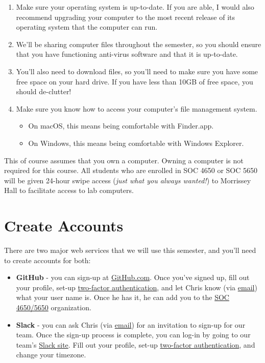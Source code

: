 \documentclass[]{book}
\providecommand{\tightlist}{%
  \setlength{\itemsep}{0pt}\setlength{\parskip}{0pt}}
\begin{document}
\begin{enumerate}
\def\labelenumi{\arabic{enumi}.}
\tightlist
\item
  Make sure your operating system is up-to-date. If you are able, I
  would also recommend upgrading your computer to the most recent
  release of its operating system that the computer can run.
\item
  We'll be sharing computer files throughout the semester, so you should
  ensure that you have functioning anti-virus software and that it is
  up-to-date.
\item
  You'll also need to download files, so you'll need to make sure you
  have some free space on your hard drive. If you have less than 10GB of
  free space, you should de-clutter!
\item
  Make sure you know how to access your computer's file management
  system.

  \begin{itemize}
  \tightlist
  \item
    On macOS, this means being comfortable with Finder.app.
  \item
    On Windows, this means being comfortable with Windows Explorer.
  \end{itemize}
\end{enumerate}

This of course assumes that you own a computer. Owning a computer is not
required for this course. All students who are enrolled in SOC 4650 or
SOC 5650 will be given 24-hour swipe access (\emph{just what you always
wanted!}) to Morrissey Hall to facilitate access to lab computers.

\section{Create Accounts}\label{create-accounts}

There are two major web services that we will use this semester, and
you'll need to create accounts for both:

\begin{itemize}
\tightlist
\item
  \textbf{GitHub} - you can sign-up at
  \href{https://github.com}{GitHub.com}. Once you've signed up, fill out
  your profile, set-up
  \href{https://help.github.com/articles/about-two-factor-authentication/}{two-factor
  authentication}, and let Chris know (via
  \href{mailto:prenercg@slu.edu}{email}) what your user name is. Once he
  has it, he can add you to the
  \href{https://github.com/slu-soc5650}{SOC 4650/5650} organization.
\item
  \textbf{Slack} - you can ask Chris (via
  \href{mailto:prenercg@slu.edu}{email}) for an invitation to sign-up
  for our team. Once the sign-up process is complete, you can log-in by
  going to our team's \href{https://slu-soc5650.slack.com}{Slack site}.
  Fill out your profile, set-up
  \href{https://get.slack.help/hc/en-us/articles/204509068-Set-up-two-factor-authentication}{two-factor
  authentication}, and change your timezone.
\end{itemize}
\end{document}
